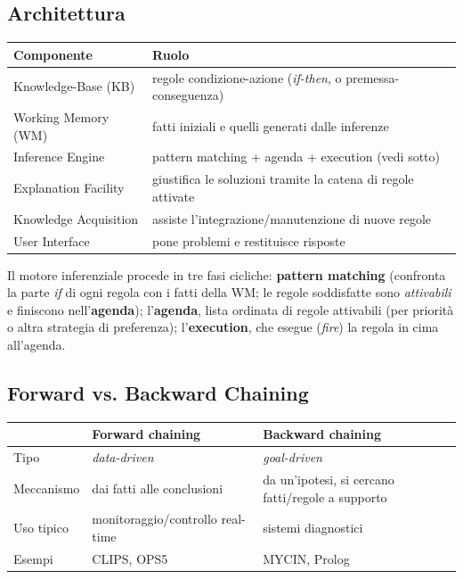 \documentclass[a4paper,11pt]{article}
\begin{document}
\subsection{Architettura}

\begin{center}
\small
\begin{tabular}{ll}
\toprule
\textbf{Componente} & \textbf{Ruolo} \\
\midrule
Knowledge-Base (KB) & regole condizione-azione (\emph{if-then}, o premessa-conseguenza) \\
Working Memory (WM) & fatti iniziali e quelli generati dalle inferenze \\
Inference Engine & pattern matching + agenda + execution (vedi sotto) \\
Explanation Facility & giustifica le soluzioni tramite la catena di regole attivate \\
Knowledge Acquisition & assiste l'integrazione/manutenzione di nuove regole \\
User Interface & pone problemi e restituisce risposte \\
\bottomrule
\end{tabular}
\end{center}

Il motore inferenziale procede in tre fasi cicliche: \textbf{pattern matching} (confronta la parte \emph{if} di ogni regola con i fatti della WM; le regole soddisfatte sono \emph{attivabili} e finiscono nell'\textbf{agenda}); l'\textbf{agenda}, lista ordinata di regole attivabili (per priorità o altra strategia di preferenza); l'\textbf{execution}, che esegue (\emph{fire}) la regola in cima all'agenda.

\subsection{Forward vs. Backward Chaining}

\begin{center}
\small
\begin{tabular}{lll}
\toprule
 & \textbf{Forward chaining} & \textbf{Backward chaining} \\
\midrule
Tipo & \emph{data-driven} & \emph{goal-driven} \\
Meccanismo & dai fatti alle conclusioni & da un'ipotesi, si cercano fatti/regole a supporto \\
Uso tipico & monitoraggio/controllo real-time & sistemi diagnostici \\
Esempi & CLIPS, OPS5 & MYCIN, Prolog \\
\bottomrule
\end{tabular}
\end{center}
\end{document}
